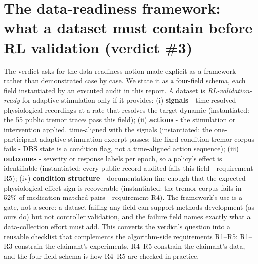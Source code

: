 \section{The data-readiness framework: what a dataset must contain before RL validation (verdict \#3)}
The verdict asks for the data-readiness notion made explicit as a framework rather than
demonstrated case by case. We state it as a four-field schema, each field instantiated
by an executed audit in this report. A dataset is \emph{RL-validation-ready} for adaptive
stimulation only if it provides: (i) \textbf{signals} - time-resolved physiological
recordings at a rate that resolves the target dynamic (instantiated: the 55 public
tremor traces pass this field); (ii) \textbf{actions} - the stimulation or intervention
applied, time-aligned with the signals (instantiated: the one-participant
adaptive-stimulation excerpt passes; the fixed-condition tremor corpus fails - DBS state
is a condition flag, not a time-aligned action sequence); (iii) \textbf{outcomes} -
severity or response labels per epoch, so a policy's effect is identifiable
(instantiated: every public record audited fails this field - requirement R5);
(iv) \textbf{condition structure} - documentation fine enough that the expected
physiological effect sign is recoverable (instantiated: the tremor corpus fails in
52\% of medication-matched pairs - requirement R4). The framework's use is a gate, not
a score: a dataset failing any field can support methods development (as ours do) but
not controller validation, and the failure field names exactly what a data-collection
effort must add. This converts the verdict's question into a reusable checklist that
complements the algorithm-side requirements R1--R5: R1--R3 constrain the claimant's
experiments, R4--R5 constrain the claimant's data, and the four-field schema is how
R4--R5 are checked in practice.


